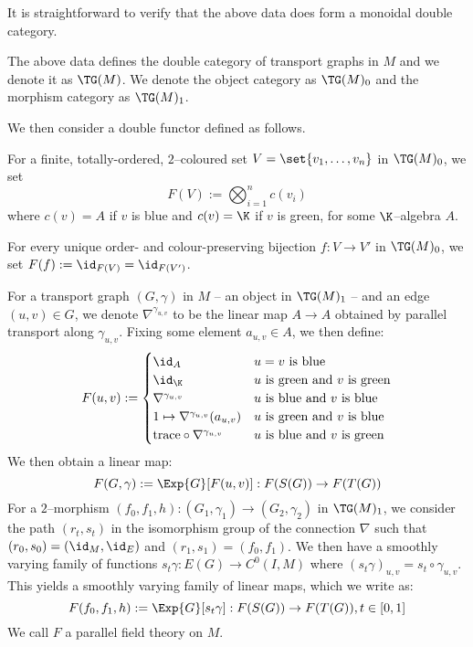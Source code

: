 It is straightforward to verify that the above data does form a monoidal double
category.

\begin{defn}
The above data defines the double category of transport graphs in $M$ and we
denote it as $\TG(M)$. We denote the object category as $\TG(M)_0$ and the
morphism category as $\TG(M)_1$.
\end{defn}

We then consider a double functor defined as follows.

\begin{defn}\label{defn:sing_man_tqft}
For a finite, totally-ordered, $2$--coloured set
$V = \set{v_1, \dots, v_n}$ in $\TG(M)_0$, we set
\[
  F(V) := \bigotimes_{i = 1}^{n} c(v_i)
\]
where $c(v) = A$ if $v$ is blue and $c(v) = \K$ if $v$ is green,
for some $\K$--algebra $A$.

For every unique order- and colour-preserving bijection $f : V \to V'$ in
$\TG(M)_0$, we set $F(f) := \id_{F(V)} = \id_{F(V')}$.

For a transport graph $(G, \gamma)$ in $M$ -- an object in $\TG(M)_1$ -- and an
edge $(u, v) \in G$, we denote $\nabla^{\gamma_{u, v}}$ to be the linear map
$A \to A$ obtained by parallel transport along $\gamma_{u, v}$. Fixing some
element $a_{u, v} \in A$, we then define:
\[
  F(u, v) := \begin{cases}
    \id_A
      & u = v \text{ is blue} \\
    \id_{\K} %
      & u \text{ is green and } v \text{ is green} \\
    \nabla^{\gamma_{u, v}}
      & u \text{ is blue and } v \text{ is blue} \\
    1 \mapsto \nabla^{\gamma_{u, v}}(a_{u, v})
      & u \text{ is green and } v \text{ is blue} \\
    \text{trace} \circ \nabla^{\gamma_{u, v}}
      & u \text{ is blue and } v \text{ is green}
  \end{cases}
\]
We then obtain a linear map:
\[
  F(G, \gamma) := \Exp{G}[F(u, v)]
               :  F(S(G)) \to F(T(G))
\]
For a $2$--morphism
$(f_0, f_1, h) : (G_1, \gamma_1) \to (G_2, \gamma_2)$ in $\TG(M)_1$, we consider
the path $(r_t, s_t)$ in the isomorphism group of the connection $\nabla$ such
that $(r_0, s_0) = (\id_M, \id_E)$ and $(r_1, s_1) = (f_0, f_1)$. We then have a
smoothly varying family of functions $s_t\gamma : E(G) \to C^0(I, M)$
where $(s_t\gamma)_{u, v} = s_t \circ \gamma_{u, v}$. This yields a smoothly
varying family of linear maps, which we write as:
\[
  F(f_0, f_1, h) := \Exp{G}[s_t\gamma]
    : F(S(G)) \to F(T(G)), t \in [0, 1]
\]
We call $F$ a parallel field theory on $M$.
\end{defn}

